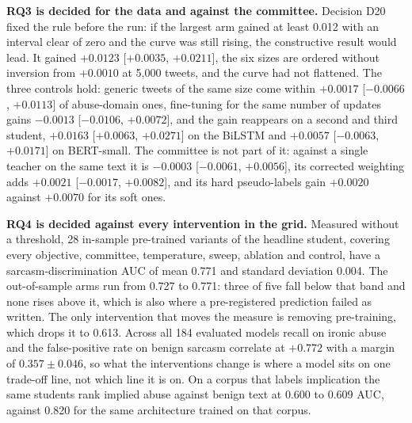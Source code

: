 \textbf{RQ3 is decided for the data and against the committee.} Decision D20 fixed the rule before the
run: if the largest arm gained at least 0.012 with an interval clear of zero and the curve was still
rising, the constructive result would lead. It gained $+0.0123$ [$+0.0035$, $+0.0211$], the six sizes
are ordered without inversion from $+0.0010$ at 5,000 tweets, and the curve had not flattened. The three
controls hold: generic tweets of the same size come within $+0.0017$ [$-0.0066$, $+0.0113$] of
abuse-domain ones, fine-tuning for the same number of updates gains $-0.0013$ [$-0.0106$, $+0.0072$],
and the gain reappears on a second and third student, $+0.0163$ [$+0.0063$, $+0.0271$] on the BiLSTM and
$+0.0057$ [$-0.0063$, $+0.0171$] on BERT-small. The committee is not part of it: against a single
teacher on the same text it is $-0.0003$ [$-0.0061$, $+0.0056$], its corrected weighting adds $+0.0021$
[$-0.0017$, $+0.0082$], and its hard pseudo-labels gain $+0.0020$ against $+0.0070$ for its soft ones.

\textbf{RQ4 is decided against every intervention in the grid.} Measured without a threshold, 28
in-sample pre-trained variants of the headline student, covering every objective, committee,
temperature, sweep, ablation and control, have a sarcasm-discrimination AUC of mean 0.771 and standard
deviation 0.004. The out-of-sample arms run from 0.727 to 0.771: three of five fall below that band and
none rises above it, which is also where a pre-registered prediction failed as written. The only
intervention that moves the measure is removing pre-training, which drops it to 0.613. Across all 184
evaluated models recall on ironic abuse and the false-positive rate on benign sarcasm correlate at
$+0.772$ with a margin of $0.357 \pm 0.046$, so what the interventions change is where a model sits on
one trade-off line, not which line it is on. On a corpus that labels implication the same students rank
implied abuse against benign text at 0.600 to 0.609 AUC, against 0.820 for the same architecture trained
on that corpus.



